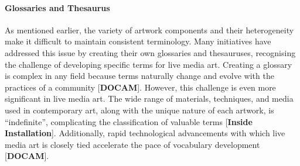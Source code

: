 \paragraph*{Glossaries and Thesaurus}
As mentioned earlier, the variety of artwork components and their heterogeneity make it difficult to maintain consistent terminology. Many initiatives have addressed this issue by creating their own glossaries and thesauruses, recognising the challenge of developing specific terms for live media art. Creating a glossary is complex in any field because terms naturally change and evolve with the practices of a community [\textbf{DOCAM}]. However, this challenge is even more significant in live media art. The wide range of materials, techniques, and media used in contemporary art, along with the unique nature of each artwork, is ``indefinite'', complicating the classification of valuable terms [\textbf{Inside Installation}]. Additionally, rapid technological advancements with which live media art is closely tied accelerate the pace of vocabulary development [\textbf{DOCAM}].\\ 
